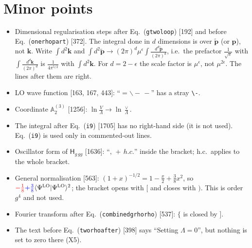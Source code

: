 \documentclass[10pt]{article}
\def\mf#1{\mathbb{#1}}
\def\v#1{\mathbf{#1}}
\newcommand{\old}[1]{{\color{red}#1}}
\newcommand{\new}[1]{{\color{blue}#1}}
\newcommand{\eqn}[1]{Eq.~(\texttt{#1})}
\begin{document}
\section{Minor points}\label{sec:minor}
\begin{itemize}
\item[M1] Dimensional regularisation steps after \eqn{gtwoloop} [192] and before \eqn{onerhopart} [372]. The integral done in $d$ dimensions is over $\tilde{\v p}$ (or $\v p$), not $\v k$. Write $\int d^2\v k$ and $\int d^2\tilde{\v p}\to(2\pi)^d\mu^{\epsilon}\int\frac{d^d\tilde{\v p}}{(2\pi)^d}$, i.e.\ the prefactor $\frac{1}{\sqrt\pi}$ with $\int\frac{d^d\v k}{(2\pi)^d}$ is $\frac{1}{4\pi^{5/2}}$ with $\int d^2\v k$. For $d=2-\epsilon$ the scale factor is $\mu^{\epsilon}$, not $\mu^{2\epsilon}$. The lines after them are right.
\item[M2] LO wave function [163, 167, 443]: ``$=\backslash\!-\,-$'' has a stray \verb|\-|.
\item[M3] Coordinate $\mf A^{(3)}_2$ [1256]: $\ln\frac{V}{\Lambda}\to\ln\frac{\vee}{\Lambda}$.
\item[M4] The integral after \eqn{i9} [1705] has no right-hand side (it is not used). \eqn{i9} is used only in commented-out lines.
\item[M5] Oscillator form of $\mathsf H_{g\,gg}$ [1636]: ``$,\,+\,h.c.$'' inside the bracket; h.c.\ applies to the whole bracket.
\item[M6] General normalisation [563]: $(1+x)^{-1/2}=1-\frac x2+\frac38x^2$, so $\old{-\frac18}\new{+\frac38}\langle\Psi^{\rm LO}|\Psi^{\rm LO}\rangle^2$; the bracket opens with $\Bigg[$ and closes with $\Bigg)$. This is order $g^4$ and not used.
\item[M7] Fourier transform after \eqn{combinedgrhorho} [537]: $\Bigg\{$ is closed by $\Bigg]$.
\item[M8] The text before \eqn{tworhoafter} [398] says ``Setting $\Lambda=0$'', but nothing is set to zero there (X5).
\end{itemize}

\end{document}
